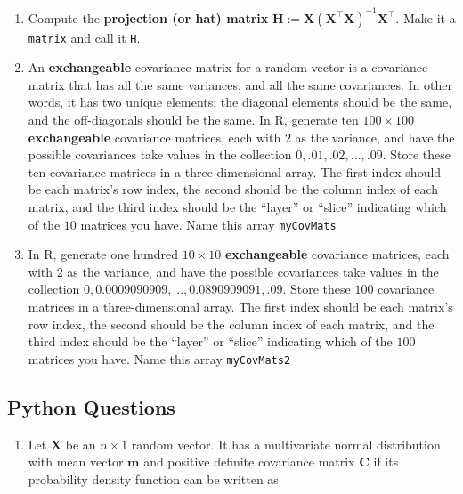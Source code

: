 \documentclass[
  12pt,
  krantz2]{krantz}
\providecommand{\tightlist}{%
  \setlength{\itemsep}{0pt}\setlength{\parskip}{0pt}}
\begin{document}
\begin{enumerate}
\def\labelenumi{\alph{enumi}.}
\item
  Compute the \textbf{projection (or hat) matrix} \(\mathbf{H} := \mathbf{X}\left(\mathbf{X}^\intercal \mathbf{X}\right)^{-1} \mathbf{X}^\intercal\). Make it a \texttt{matrix} and call it \texttt{H}.
\item
  An \textbf{exchangeable} covariance matrix for a random vector is a covariance matrix that has all the same variances, and all the same covariances. In other words, it has two unique elements: the diagonal elements should be the same, and the off-diagonals should be the same. In R, generate ten \(100 \times 100\) \textbf{exchangeable} covariance matrices, each with \(2\) as the variance, and have the possible covariances take values in the collection \(0,.01,.02, ..., .09.\) Store these ten covariance matrices in a three-dimensional array. The first index should be each matrix's row index, the second should be the column index of each matrix, and the third index should be the ``layer'' or ``slice'' indicating which of the \(10\) matrices you have. Name this array \texttt{myCovMats}
\item
  In R, generate one hundred \(10 \times 10\) \textbf{exchangeable} covariance matrices, each with \(2\) as the variance, and have the possible covariances take values in the collection \(0,0.0009090909, ..., 0.0890909091, .09.\) Store these \(100\) covariance matrices in a three-dimensional array. The first index should be each matrix's row index, the second should be the column index of each matrix, and the third index should be the ``layer'' or ``slice'' indicating which of the \(100\) matrices you have. Name this array \texttt{myCovMats2}
\end{enumerate}

\hypertarget{python-questions-2}{%
\subsection{Python Questions}\label{python-questions-2}}

\begin{enumerate}
\def\labelenumi{\arabic{enumi}.}
\tightlist
\item
  Let \(\mathbf{X}\) be an \(n \times 1\) random vector. It has a multivariate normal distribution with mean vector \(\mathbf{m}\) and positive definite covariance matrix \(\mathbf{C}\) if its probability density function can be written as
\end{enumerate}
\end{document}
